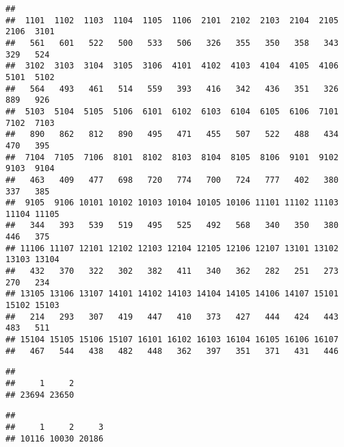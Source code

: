 \documentclass[
]{book}
\newenvironment{Shaded}{\begin{snugshade}}{\end{snugshade}}
\newcommand{\FunctionTok}[1]{\textcolor[rgb]{0.00,0.00,0.00}{#1}}
\newcommand{\NormalTok}[1]{#1}
\newcommand{\SpecialCharTok}[1]{\textcolor[rgb]{0.00,0.00,0.00}{#1}}
\theoremstyle{definition}
\theoremstyle{definition}
\theoremstyle{definition}
\theoremstyle{definition}
\theoremstyle{remark}
\begin{document}
\begin{verbatim}
## 
##  1101  1102  1103  1104  1105  1106  2101  2102  2103  2104  2105  2106  3101 
##   561   601   522   500   533   506   326   355   350   358   343   329   524 
##  3102  3103  3104  3105  3106  4101  4102  4103  4104  4105  4106  5101  5102 
##   564   493   461   514   559   393   416   342   436   351   326   889   926 
##  5103  5104  5105  5106  6101  6102  6103  6104  6105  6106  7101  7102  7103 
##   890   862   812   890   495   471   455   507   522   488   434   470   395 
##  7104  7105  7106  8101  8102  8103  8104  8105  8106  9101  9102  9103  9104 
##   463   409   477   698   720   774   700   724   777   402   380   337   385 
##  9105  9106 10101 10102 10103 10104 10105 10106 11101 11102 11103 11104 11105 
##   344   393   539   519   495   525   492   568   340   350   380   446   375 
## 11106 11107 12101 12102 12103 12104 12105 12106 12107 13101 13102 13103 13104 
##   432   370   322   302   382   411   340   362   282   251   273   270   234 
## 13105 13106 13107 14101 14102 14103 14104 14105 14106 14107 15101 15102 15103 
##   214   293   307   419   447   410   373   427   444   424   443   483   511 
## 15104 15105 15106 15107 16101 16102 16103 16104 16105 16106 16107 
##   467   544   438   482   448   362   397   351   371   431   446
\end{verbatim}

\begin{Shaded}
\end{Shaded}

\begin{verbatim}
## 
##     1     2 
## 23694 23650
\end{verbatim}

\begin{Shaded}
\end{Shaded}

\begin{verbatim}
## 
##     1     2     3 
## 10116 10030 20186
\end{verbatim}

\begin{Shaded}
\end{Shaded}
\end{document}
